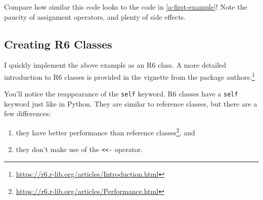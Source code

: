 \documentclass[12pt,krantz2]{krantz}
\providecommand{\tightlist}{%
  \setlength{\itemsep}{0pt}\setlength{\parskip}{0pt}}
\renewcommand{\href}[2]{#2\footnote{\url{#1}}}
\begin{document}
Compare how similar this code looks to the code in \ref{a-first-example}! Note the paucity of assignment operators, and plenty of side effects.

\hypertarget{creating-r6-classes}{%
\subsection{Creating R6 Classes}\label{creating-r6-classes}}

I quickly implement the above example as an R6 class. A more detailed introduction to R6 classes is provided in \href{https://r6.r-lib.org/articles/Introduction.html}{the vignette from the package authors.}

You'll notice the reappearance of the \texttt{self} keyword. R6 classes have a \texttt{self} keyword just like in Python. They are similar to reference classes, but there are a few differences:

\begin{enumerate}
\def\labelenumi{\arabic{enumi}.}
\tightlist
\item
  they have \href{https://r6.r-lib.org/articles/Performance.html}{better performance than reference classes}, and
\item
  they don't make use of the \texttt{\textless{}\textless{}-} operator.
\end{enumerate}
\end{document}
